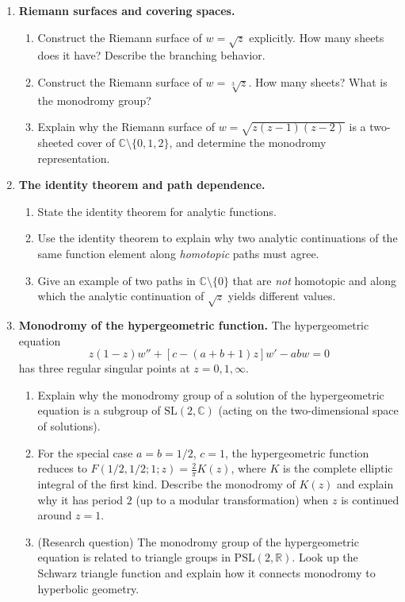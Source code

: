 \begin{enumerate}
    \item \textbf{Riemann surfaces and covering spaces.}
    \begin{enumerate}
        \item Construct the Riemann surface of $w = \sqrt{z}$ explicitly. How many sheets does it have? Describe the branching behavior.
        \item Construct the Riemann surface of $w = \sqrt[3]{z}$. How many sheets? What is the monodromy group?
        \item Explain why the Riemann surface of $w = \sqrt{z(z-1)(z-2)}$ is a two-sheeted cover of $\mathbb{C} \setminus \{0, 1, 2\}$, and determine the monodromy representation.
    \end{enumerate}

    \item \textbf{The identity theorem and path dependence.}
    \begin{enumerate}
        \item State the identity theorem for analytic functions.
        \item Use the identity theorem to explain why two analytic continuations of the same function element along \emph{homotopic} paths must agree.
        \item Give an example of two paths in $\mathbb{C} \setminus \{0\}$ that are \emph{not} homotopic and along which the analytic continuation of $\sqrt{z}$ yields different values.
    \end{enumerate}

    \item[$\star$] \textbf{Monodromy of the hypergeometric function.}
    The hypergeometric equation
    \[
        z(1-z)w'' + [c - (a+b+1)z]w' - abw = 0
    \]
    has three regular singular points at $z = 0, 1, \infty$.
    \begin{enumerate}
        \item Explain why the monodromy group of a solution of the hypergeometric equation is a subgroup of $\mathrm{SL}(2, \mathbb{C})$ (acting on the two-dimensional space of solutions).
        \item For the special case $a = b = 1/2$, $c = 1$, the hypergeometric function reduces to $F(1/2, 1/2; 1; z) = \frac{2}{\pi} K(z)$, where $K$ is the complete elliptic integral of the first kind. Describe the monodromy of $K(z)$ and explain why it has period $2$ (up to a modular transformation) when $z$ is continued around $z = 1$.
        \item (Research question) The monodromy group of the hypergeometric equation is related to triangle groups in $\mathrm{PSL}(2, \mathbb{R})$. Look up the Schwarz triangle function and explain how it connects monodromy to hyperbolic geometry.
    \end{enumerate}

\end{enumerate}
